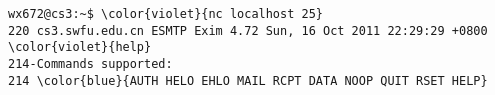 \documentclass[varwidth=35.3em,crop]{standalone}
\begin{document}
\pagestyle{empty}

\begin{Verbatim}[commandchars=\\\{\}]
wx672@cs3:~$ \color{violet}{nc localhost 25}
220 cs3.swfu.edu.cn ESMTP Exim 4.72 Sun, 16 Oct 2011 22:29:29 +0800
\color{violet}{help}
214-Commands supported:
214 \color{blue}{AUTH HELO EHLO MAIL RCPT DATA NOOP QUIT RSET HELP}
\end{Verbatim}
\end{document}
